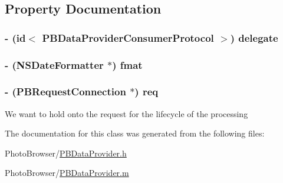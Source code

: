 \subsection{Property Documentation}
\hypertarget{interface_p_b_data_provider_a68117050d352cc1b3a3ad6267d45ed39}{
\subsubsection[{delegate}]{\setlength{\rightskip}{0pt plus 5cm}-\/ (id$<$ {\bf PBDataProviderConsumerProtocol} $>$) delegate}}
\label{interface_p_b_data_provider_a68117050d352cc1b3a3ad6267d45ed39}
\hypertarget{interface_p_b_data_provider_a148f8968959e9479440e1603022bc162}{
\subsubsection[{fmat}]{\setlength{\rightskip}{0pt plus 5cm}-\/ (NSDateFormatter $\ast$) fmat}}
\label{interface_p_b_data_provider_a148f8968959e9479440e1603022bc162}
\hypertarget{interface_p_b_data_provider_aeb946996c2b8bff6715ae772cd39fe48}{
\subsubsection[{req}]{\setlength{\rightskip}{0pt plus 5cm}-\/ ({\bf PBRequestConnection} $\ast$) req}}
\label{interface_p_b_data_provider_aeb946996c2b8bff6715ae772cd39fe48}
We want to hold onto the request for the lifecycle of the processing 

The documentation for this class was generated from the following files:\begin{DoxyCompactItemize}
\item 
PhotoBrowser/\hyperlink{_p_b_data_provider_8h}{PBDataProvider.h}\item 
PhotoBrowser/\hyperlink{_p_b_data_provider_8m}{PBDataProvider.m}\end{DoxyCompactItemize}
